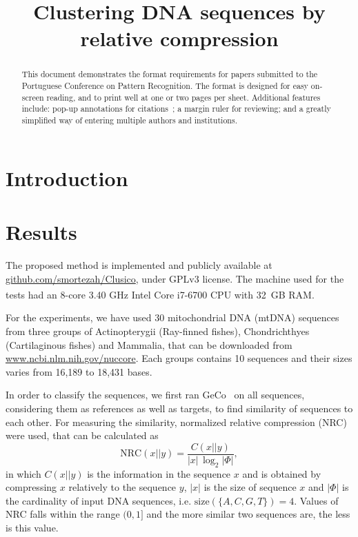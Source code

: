 \documentclass[extendedabs]{recpad2k}
\title{Clustering DNA sequences by relative compression}
\begin{document}
\maketitle

\begin{abstract}
   This document demonstrates the format requirements for papers submitted
   to the Portuguese Conference on Pattern Recognition.  The format is designed for
   easy on-screen reading, and to print well at one or two pages per sheet.
   Additional features include: pop-up annotations for
   citations~\cite{Authors06,Mermin89}; a margin ruler for reviewing; and a
   greatly simplified way of entering multiple authors and institutions.
\end{abstract}

\section{Introduction}


\section{Results}
The proposed method is implemented and publicly available at \url{github.com/smortezah/Clusico}, under GPLv3 license. The machine used for the tests had an 8-core 3.40 GHz Intel\textsuperscript{\scriptsize\textregistered} Core{\scriptsize\texttrademark} i7-6700 CPU with 32~GB RAM.

For the experiments, we have used 30 mitochondrial DNA (mtDNA) sequences from three groups of Actinopterygii (Ray-finned fishes), Chondrichthyes (Cartilaginous fishes) and Mammalia, that can be downloaded from \url{www.ncbi.nlm.nih.gov/nuccore}. Each groups contains 10 sequences and their sizes varies from 16,189 to 18,431 bases.

In order to classify the sequences, we first ran GeCo~\cite{pratas2016efficient} on all sequences, considering them as references as well as targets, to find similarity of sequences to each other. For measuring the similarity, normalized relative compression (NRC) were used, that can be calculated as~\cite{pratas2018comparison}
\begin{equation}
   \mathrm{NRC} (x||y) = \frac{C (x||y)}{|x|\, \log_2 |\Phi|},
\end{equation}
in which $C (x||y)$ is the information in the sequence $x$ and is obtained by compressing $x$ relatively to the sequence $y$, $|x|$ is the size of sequence $x$ and $|\Phi|$ is the cardinality of input DNA sequences, i.e. $ \mathrm{size}(\{A, C, G, T\}) = 4 $. Values of NRC falls within the range $(0, 1]$ and the more similar two sequences are, the less is this value.
\end{document}
